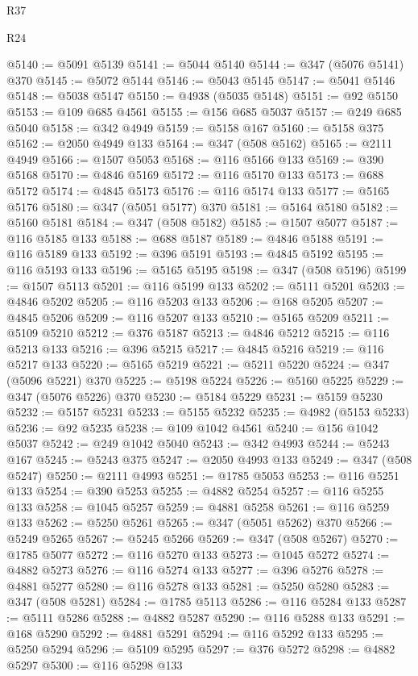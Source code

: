 \begin{lexlean}{R37}
\begin{lexlean}{R24}
\begin{coremodule}
{{{{{{{{{{{{{{{{{{{{{{{{{{{{{{{{{{{{{{{{{{{{{{{{{{{{{{{{{{{{{{{{{{{{{{{{{{{{{{{{{{{{{{{{{{{{{{{{{{{{{{{{{{{{{{{{{{{{{{{{{{{{{{{{{{{{{{{{{{{{{{{{{{{{{{{{{{{{{{{{{{{{{{{{{{{{{{{{{{{{{{{{{@5140 := @5091 @5139
@5141 := @5044 @5140
@5144 := @347 (@5076 @5141) @370
@5145 := @5072 @5144
@5146 := @5043 @5145
@5147 := @5041 @5146
@5148 := @5038 @5147
@5150 := @4938 (@5035 @5148)
@5151 := @92 @5150
@5153 := @109 @685 @4561
@5155 := @156 @685 @5037
@5157 := @249 @685 @5040
@5158 := @342 @4949
@5159 := @5158 @167
@5160 := @5158 @375
@5162 := @2050 @4949 @133
@5164 := @347 (@508 @5162)
@5165 := @2111 @4949
@5166 := @1507 @5053
@5168 := @116 @5166 @133
@5169 := @390 @5168
@5170 := @4846 @5169
@5172 := @116 @5170 @133
@5173 := @688 @5172
@5174 := @4845 @5173
@5176 := @116 @5174 @133
@5177 := @5165 @5176
@5180 := @347 (@5051 @5177) @370
@5181 := @5164 @5180
@5182 := @5160 @5181
@5184 := @347 (@508 @5182)
@5185 := @1507 @5077
@5187 := @116 @5185 @133
@5188 := @688 @5187
@5189 := @4846 @5188
@5191 := @116 @5189 @133
@5192 := @396 @5191
@5193 := @4845 @5192
@5195 := @116 @5193 @133
@5196 := @5165 @5195
@5198 := @347 (@508 @5196)
@5199 := @1507 @5113
@5201 := @116 @5199 @133
@5202 := @5111 @5201
@5203 := @4846 @5202
@5205 := @116 @5203 @133
@5206 := @168 @5205
@5207 := @4845 @5206
@5209 := @116 @5207 @133
@5210 := @5165 @5209
@5211 := @5109 @5210
@5212 := @376 @5187
@5213 := @4846 @5212
@5215 := @116 @5213 @133
@5216 := @396 @5215
@5217 := @4845 @5216
@5219 := @116 @5217 @133
@5220 := @5165 @5219
@5221 := @5211 @5220
@5224 := @347 (@5096 @5221) @370
@5225 := @5198 @5224
@5226 := @5160 @5225
@5229 := @347 (@5076 @5226) @370
@5230 := @5184 @5229
@5231 := @5159 @5230
@5232 := @5157 @5231
@5233 := @5155 @5232
@5235 := @4982 (@5153 @5233)
@5236 := @92 @5235
@5238 := @109 @1042 @4561
@5240 := @156 @1042 @5037
@5242 := @249 @1042 @5040
@5243 := @342 @4993
@5244 := @5243 @167
@5245 := @5243 @375
@5247 := @2050 @4993 @133
@5249 := @347 (@508 @5247)
@5250 := @2111 @4993
@5251 := @1785 @5053
@5253 := @116 @5251 @133
@5254 := @390 @5253
@5255 := @4882 @5254
@5257 := @116 @5255 @133
@5258 := @1045 @5257
@5259 := @4881 @5258
@5261 := @116 @5259 @133
@5262 := @5250 @5261
@5265 := @347 (@5051 @5262) @370
@5266 := @5249 @5265
@5267 := @5245 @5266
@5269 := @347 (@508 @5267)
@5270 := @1785 @5077
@5272 := @116 @5270 @133
@5273 := @1045 @5272
@5274 := @4882 @5273
@5276 := @116 @5274 @133
@5277 := @396 @5276
@5278 := @4881 @5277
@5280 := @116 @5278 @133
@5281 := @5250 @5280
@5283 := @347 (@508 @5281)
@5284 := @1785 @5113
@5286 := @116 @5284 @133
@5287 := @5111 @5286
@5288 := @4882 @5287
@5290 := @116 @5288 @133
@5291 := @168 @5290
@5292 := @4881 @5291
@5294 := @116 @5292 @133
@5295 := @5250 @5294
@5296 := @5109 @5295
@5297 := @376 @5272
@5298 := @4882 @5297
@5300 := @116 @5298 @133
}}}}}}}}}}}}}}}}}}}}}}}}}}}}}}}}}}}}}}}}}}}}}}}}}}}}}}}}}}}}}}}}}}}}}}}}}}}}}}}}}}}}}}}}}}}}}}}}}}}}}}}}}}}}}}}}}}}}}}}}}}}}}}}}}}}}}}}}}}}}}}}}}}}}}}}}}}}}}}}}}}}}}}}}}}}}}}}}}}}}}}}}}
\end{coremodule}
\end{lexlean}
\end{lexlean}
